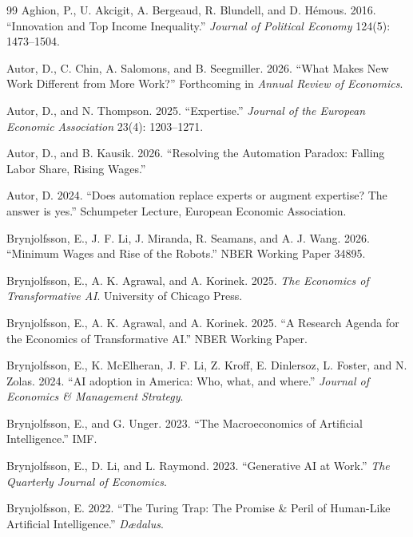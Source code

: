 \documentclass[11pt]{article}
\begin{document}
\begin{thebibliography}{99}
Aghion, P., U. Akcigit, A. Bergeaud, R. Blundell, and D. H\'emous. 2016.
\newblock ``Innovation and Top Income Inequality.''
\newblock \emph{Journal of Political Economy} 124(5): 1473--1504.

Autor, D., C. Chin, A. Salomons, and B. Seegmiller. 2026.
\newblock ``What Makes New Work Different from More Work?''
\newblock Forthcoming in \emph{Annual Review of Economics}.

Autor, D., and N. Thompson. 2025.
\newblock ``Expertise.''
\newblock \emph{Journal of the European Economic Association} 23(4): 1203--1271.

Autor, D., and B. Kausik. 2026.
\newblock ``Resolving the Automation Paradox: Falling Labor Share, Rising Wages.''

Autor, D. 2024.
\newblock ``Does automation replace experts or augment expertise? The answer is yes.''
 Schumpeter Lecture, European Economic Association.

Brynjolfsson, E., J. F. Li, J. Miranda, R. Seamans, and A. J. Wang. 2026.
\newblock ``Minimum Wages and Rise of the Robots.''
\newblock NBER Working Paper 34895.

Brynjolfsson, E., A. K. Agrawal, and A. Korinek. 2025.
\newblock \emph{The Economics of Transformative AI}.
\newblock University of Chicago Press.

Brynjolfsson, E., A. K. Agrawal, and A. Korinek. 2025.
\newblock ``A Research Agenda for the Economics of Transformative AI.''
\newblock NBER Working Paper.

Brynjolfsson, E., K. McElheran, J. F. Li, Z. Kroff, E. Dinlersoz, L. Foster, and N. Zolas. 2024.
\newblock ``AI adoption in America: Who, what, and where.''
\newblock \emph{Journal of Economics \& Management Strategy}.

Brynjolfsson, E., and G. Unger. 2023.
\newblock ``The Macroeconomics of Artificial Intelligence.''
\newblock IMF.

Brynjolfsson, E., D. Li, and L. Raymond. 2023.
\newblock ``Generative AI at Work.''
\newblock \emph{The Quarterly Journal of Economics}.

Brynjolfsson, E. 2022.
\newblock ``The Turing Trap: The Promise \& Peril of Human-Like Artificial Intelligence.''
\newblock \emph{D\ae dalus}.


\end{thebibliography}
\end{document}
